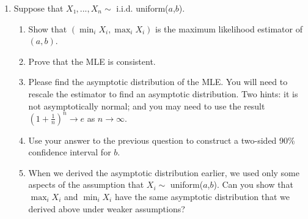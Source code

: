 \begin{enumerate}
\item Suppose that $X₁,...,X_n ∼$ i.i.d. uniform($a$,$b$).
  \begin{enumerate}
  \item Show that $(\min_i X_i, \max_i X_i)$ is the maximum likelihood
    estimator of $(a,b)$.
  \item Prove that the MLE is consistent.
  \item Please find the asymptotic distribution of the MLE.  You will
    need to rescale the estimator to find an asymptotic distribution.
    Two hints: it is not asymptotically normal; and you may need to
    use the result $(1 + \tfrac{1}{n})^n → e$ as $n → ∞$.
  \item Use your answer to the previous question to construct a
    two-sided 90\% confidence interval for $b$.
  \item When we derived the asymptotic distribution earlier, we used
    only some aspects of the assumption that $X_i ∼$ uniform($a$,$b$).
    Can you show that $\max_i X_i$ and $\min_i X_i$ have the same
    asymptotic distribution that we derived above under weaker
    assumptions?
  \end{enumerate}

\end{enumerate}

